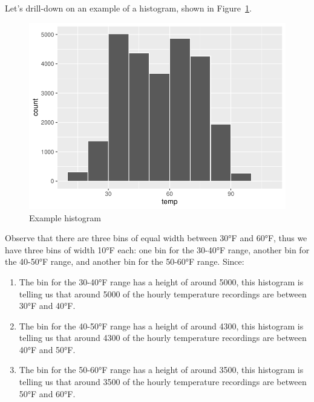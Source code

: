 \documentclass[
  letterpaper,
  DIV=11,
  numbers=noendperiod]{scrreprt}
\providecommand{\tightlist}{%
  \setlength{\itemsep}{0pt}\setlength{\parskip}{0pt}}\usepackage{longtable,booktabs,array}
\theoremstyle{definition}
\theoremstyle{remark}
\begin{document}
Let's drill-down on an example of a histogram, shown in
Figure~\ref{fig-histogramexample}.

\begin{figure}

{\centering \includegraphics{02-visualization_files/figure-pdf/fig-histogramexample-1.pdf}

}

\caption{\label{fig-histogramexample}Example histogram}

\end{figure}

Observe that there are three bins of equal width between 30°F and 60°F,
thus we have three bins of width 10°F each: one bin for the 30-40°F
range, another bin for the 40-50°F range, and another bin for the
50-60°F range. Since:

\begin{enumerate}
\def\labelenumi{\arabic{enumi}.}
\tightlist
\item
  The bin for the 30-40°F range has a height of around 5000, this
  histogram is telling us that around 5000 of the hourly temperature
  recordings are between 30°F and 40°F.
\item
  The bin for the 40-50°F range has a height of around 4300, this
  histogram is telling us that around 4300 of the hourly temperature
  recordings are between 40°F and 50°F.
\item
  The bin for the 50-60°F range has a height of around 3500, this
  histogram is telling us that around 3500 of the hourly temperature
  recordings are between 50°F and 60°F.
\end{enumerate}
\end{document}

